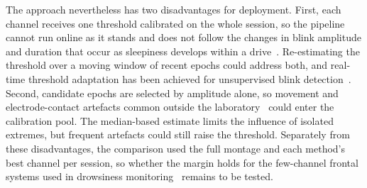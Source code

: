 
The approach nevertheless has two disadvantages for deployment. First, each channel receives one threshold calibrated on the whole session, so the pipeline cannot run online as it stands and does not follow the changes in blink amplitude and duration that occur as sleepiness develops within a drive~\citep{akerstedt2010reaction,ingre2006subjective}. Re-estimating the threshold over a moving window of recent epochs could address both, and real-time threshold adaptation has been achieved for unsupervised blink detection~\citep{chang2016unsupervised}. Second, candidate epochs are selected by amplitude alone, so movement and electrode-contact artefacts common outside the laboratory~\citep{casson2019wearable} could enter the calibration pool. The median-based estimate limits the influence of isolated extremes, but frequent artefacts could still raise the threshold. Separately from these disadvantages, the comparison used the full montage and each method's best channel per session, so whether the margin holds for the few-channel frontal systems used in drowsiness monitoring~\citep{ko2020eyeblink,shahbakhti2022simultaneous} remains to be tested.
